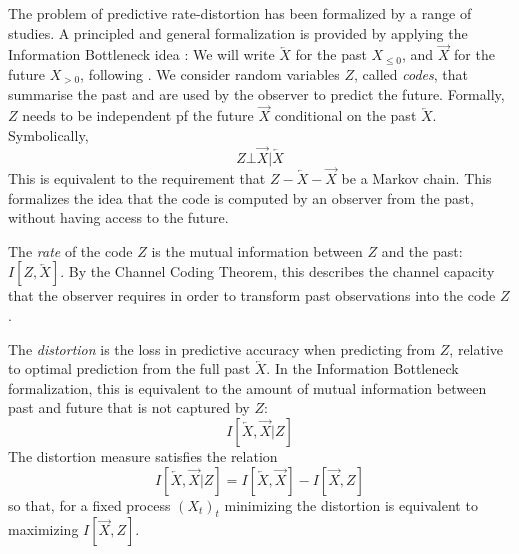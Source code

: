 \documentclass[11pt,letterpaper]{article}
\begin{document}
The problem of predictive rate-distortion has been formalized by a range of studies.
A principled and general formalization is provided by applying the Information Bottleneck idea \citep{still-optimal-2010, marzen-predictive-2016}:
We will write $\overleftarrow{X}$ for the past $X_{\leq 0}$, and $\overrightarrow{X}$ for the future $X_{> 0}$, following \cite{marzen-predictive-2016}.
We consider random variables $Z$, called \emph{codes}, that summarise the past and are used by the observer to predict the future.
Formally, $Z$ needs to be independent pf the future $\overrightarrow{X}$ conditional on the past $\overleftarrow{X}$. Symbolically, 
\begin{equation}
	Z \bot \overrightarrow{X} | \overleftarrow{X}
\end{equation}
This is equivalent to the requirement that $Z - \overleftarrow{X} - \overrightarrow{X}$ be a Markov chain.
This formalizes the idea that the code is computed by an observer from the past, without having access to the future.



The \emph{rate} of the code $Z$ is the mutual information between $Z$ and the past: $I[Z, \overleftarrow{X}]$.
By the Channel Coding Theorem, this describes the channel capacity that the observer requires in order to transform past observations into the code $Z$.

The \emph{distortion} is the loss in predictive accuracy when predicting from $Z$, relative to optimal prediction from the full past $\overleftarrow{X}$.
In the Information Bottleneck formalization, this
is equivalent to the amount of mutual information between past and future that is not captured by $Z$:
\begin{equation}
	I[\overleftarrow{X}, \overrightarrow{X}|Z]
\end{equation}
The distortion measure satisfies the relation
\begin{equation}
	I[\overleftarrow{X}, \overrightarrow{X}|Z] = I[\overleftarrow{X}, \overrightarrow{X}] - I[\overrightarrow{X}, Z]
\end{equation}
so that, for a fixed process $(X_t)_t$ minimizing the distortion is equivalent to maximizing $I[\overrightarrow{X}, Z]$.
\end{document}

